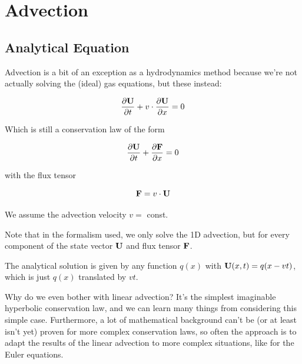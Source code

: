 \newpage
\section{Advection}\label{chap:advection}



\subsection{Analytical Equation}

Advection is a bit of an exception as a hydrodynamics method because we're not actually solving the (ideal) gas equations, but these instead:

\begin{equation}
	\frac{\partial  \mathbf{U} }{\partial t} + v \cdot \frac{\partial \mathbf{U}}{\partial x} = 0
\end{equation}


Which is still a conservation law of the form

\begin{equation}
	\frac{\partial  \mathbf{U} }{\partial t} + \frac{\partial \mathbf{F}}{\partial x} = 0
\end{equation}

with the flux tensor 

\begin{equation}
	\mathbf{F} = v \cdot \mathbf{U}
\end{equation}

We assume the advection velocity $v = $ const.

Note that in the formalism used, we only solve the 1D advection, but for every component of the state vector $\mathbf{U}$ and flux tensor $\mathbf{F}$.

The analytical solution is given by any function $q(x)$ with $\mathbf{U}(x,t) = q(x - v t)$, which is just $q(x)$ translated by $v t$.


Why do we even bother with linear advection?
It's the simplest imaginable hyperbolic conservation law, and we can learn many things from considering this simple case.
Furthermore, a lot of mathematical background can't be (or at least isn't yet) proven for more complex conservation laws, so often the approach is to adapt the results of the linear advection to more complex situations, like for the Euler equations.







